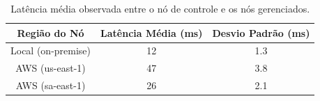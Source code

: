 \begin{table}[ht!]
\centering
\caption{Latência média observada entre o nó de controle e os nós gerenciados.}
\begin{tabular}{|c|c|c|}
\hline
\textbf{Região do Nó} & \textbf{Latência Média (ms)} & \textbf{Desvio Padrão (ms)} \\
\hline
Local (on-premise) & 12 & 1.3 \\
AWS (us-east-1)    & 47 & 3.8 \\
AWS (sa-east-1)    & 26 & 2.1 \\
\hline
\end{tabular}
\end{table}




